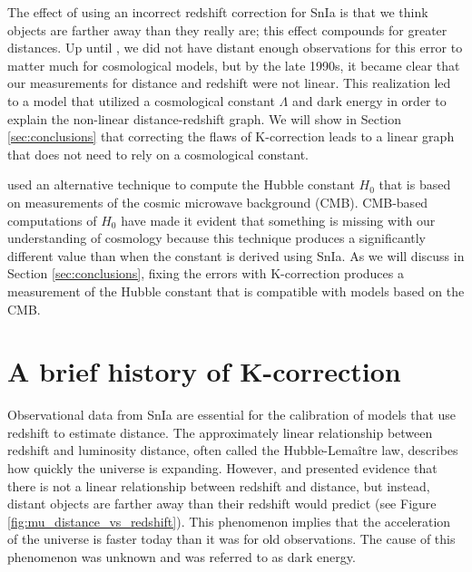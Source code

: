 \documentclass[aps,prl,reprint,amsmath]{revtex4-2}
\begin{document}
The effect of using an incorrect redshift correction for SnIa is that we think
objects are farther away than they really are; this effect compounds for
greater distances. Up until \citet{riess1998}, we did not have distant enough
observations for this error to matter much for cosmological models, but by the
late 1990s, it became clear that our measurements for distance and redshift
were not linear. This realization led to a model that utilized a cosmological
constant $\Lambda$ and dark energy in order to explain the non-linear
distance-redshift graph. We will show in Section \ref{sec:conclusions} that
correcting the flaws of K-correction leads to a linear graph that does not
need to rely on a cosmological constant.

\citet{planck2015} used an alternative technique to compute the Hubble constant
$H_0$ that is based on measurements of the cosmic microwave background (CMB).
CMB-based computations of $H_0$ have made it evident that something is missing
with our understanding of cosmology because this technique produces a
significantly different value than when the constant is derived using SnIa.  As
we will discuss in Section \ref{sec:conclusions}, fixing the errors with
K-correction produces a measurement of the Hubble constant that is compatible
with models based on the CMB.

\section{A brief history of K-correction}
\label{sec:history}

Observational data from SnIa are essential for the calibration of models that
use redshift to estimate distance. The approximately linear relationship
between redshift and luminosity distance, often called the Hubble-Lema\^{i}tre law,
describes how quickly the universe is expanding. However, \citet{riess1998}
and \citet{perlmutter1999} presented evidence that there is not a linear
relationship between redshift and distance, but instead, distant objects are
farther away than their redshift would predict (see Figure
\ref{fig:mu_distance_vs_redshift}). This phenomenon implies that the
acceleration of the universe is faster today than it was for old observations.
The cause of this phenomenon was unknown and was referred to as dark energy.
\end{document}
